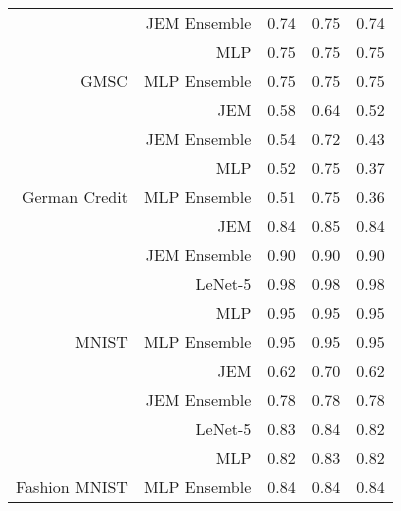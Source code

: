 \begin{table}
\begin{tabular}[t]{rrrrr}
 & JEM Ensemble & 0.74 & 0.75 & 0.74\\

 & MLP & 0.75 & 0.75 & 0.75\\

\multirow[t]{-4}{*}{\raggedleft\arraybackslash GMSC} & MLP Ensemble & 0.75 & 0.75 & 0.75\\
\cmidrule{1-5}
 & JEM & 0.58 & 0.64 & 0.52\\

 & JEM Ensemble & 0.54 & 0.72 & 0.43\\

 & MLP & 0.52 & 0.75 & 0.37\\

\multirow[t]{-4}{*}{\raggedleft\arraybackslash German Credit} & MLP Ensemble & 0.51 & 0.75 & 0.36\\
\cmidrule{1-5}
 & JEM & 0.84 & 0.85 & 0.84\\

 & JEM Ensemble & 0.90 & 0.90 & 0.90\\

 & LeNet-5 & 0.98 & 0.98 & 0.98\\

 & MLP & 0.95 & 0.95 & 0.95\\

\multirow[t]{-5}{*}{\raggedleft\arraybackslash MNIST} & MLP Ensemble & 0.95 & 0.95 & 0.95\\
\cmidrule{1-5}
 & JEM & 0.62 & 0.70 & 0.62\\

 & JEM Ensemble & 0.78 & 0.78 & 0.78\\

 & LeNet-5 & 0.83 & 0.84 & 0.82\\

 & MLP & 0.82 & 0.83 & 0.82\\

\multirow[t]{-5}{*}{\raggedleft\arraybackslash Fashion MNIST} & MLP Ensemble & 0.84 & 0.84 & 0.84\\
\bottomrule
\end{tabular}
\end{table}

